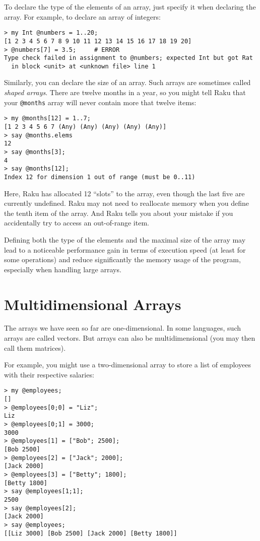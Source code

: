 To declare the type of the elements of an array, just 
specify it when declaring the array. For example, to 
declare an array of integers:

\begin{verbatim}
> my Int @numbers = 1..20;
[1 2 3 4 5 6 7 8 9 10 11 12 13 14 15 16 17 18 19 20]
> @numbers[7] = 3.5;     # ERROR
Type check failed in assignment to @numbers; expected Int but got Rat
  in block <unit> at <unknown file> line 1
\end{verbatim}
%

Similarly, you can declare the size of an array. Such arrays 
are sometimes called \emph{shaped arrays}. There are 
twelve months in a year, so you might tell Raku that your 
\verb'@months' array will never contain more that twelve 
items:
\begin{verbatim}
> my @months[12] = 1..7;
[1 2 3 4 5 6 7 (Any) (Any) (Any) (Any) (Any)]
> say @months.elems
12
> say @months[3];
4
> say @months[12];
Index 12 for dimension 1 out of range (must be 0..11)
\end{verbatim}
%

Here, Raku has allocated 12 ``slots'' to the array, even though 
the last five are currently undefined. Raku may not need 
to reallocate memory when you define the tenth item of 
the array. And Raku tells you about your mistake if you 
accidentally try to access an out-of-range item.

Defining both the type of the elements and the maximal size 
of the array may lead to a noticeable performance gain 
in terms of execution speed (at least for some operations) 
and reduce significantly the memory usage of the program, 
especially when handling large arrays.

\section{Multidimensional Arrays}
\label{multidimensional_array}

The arrays we have seen so far are one-dimensional. In some 
languages, such arrays are called vectors. But arrays can 
also be multidimensional (you may then call them matrices).

For example, you might use a two-dimensional array to 
store a list of employees with their respective salaries:

\begin{verbatim}
> my @employees;
[]
> @employees[0;0] = "Liz";
Liz
> @employees[0;1] = 3000;
3000
> @employees[1] = ["Bob"; 2500];
[Bob 2500]
> @employees[2] = ["Jack"; 2000];
[Jack 2000]
> @employees[3] = ["Betty"; 1800];
[Betty 1800]
> say @employees[1;1];
2500
> say @employees[2];
[Jack 2000]
> say @employees;
[[Liz 3000] [Bob 2500] [Jack 2000] [Betty 1800]]
\end{verbatim}

